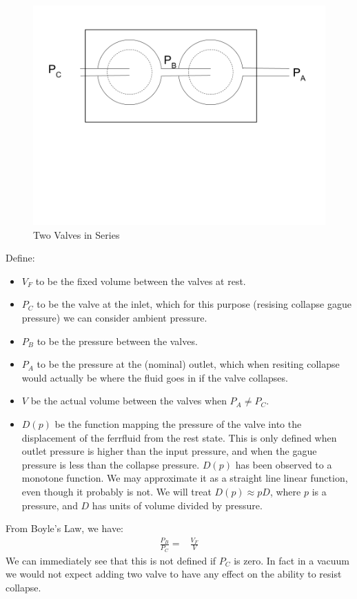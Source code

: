 \documentclass{asme2ej}
\begin{document}
\begin{figure}
\centerline{\includegraphics[width=6in]{figure/TwoValvesInSeries.png}}
\caption{Two Valves in Series}
\label{fig:Series}
\end{figure}

Define:
\begin{itemize}
\item $V_F$ to be the fixed volume between the valves at rest.
\item $P_C$ to be the valve at the inlet, which for this purpose (resising collapse gague pressure) we can consider ambient pressure.
\item $P_B$ to be the pressure between the valves.
\item $P_A$ to be the pressure at the (nominal) outlet, which when resiting
  collapse would actually be where the fluid goes in if the valve collapses.
\item $V$ be the actual volume between the valves when $P_A \neq P_C$.
\item $D(p)$ be the function mapping the pressure of the valve into
  the displacement of the ferrfluid from the rest state. This is
  only defined when outlet pressure is higher than the input pressure, and
  when the gague pressure is less than the collapse pressure. $D(p)$ has
  been observed to a monotone function. We may approximate it as a
  straight line linear function, even though it probably is not.
  We will treat $D(p) \approx pD$, where $p$ is a pressure, and $D$ has
  units of volume divided by pressure.
\end{itemize}

From Boyle's Law, we have:
\begin{align}
  \frac{P_B}{P_C} = & \frac{V_F}{V}
  \label{eq:boyle}
  \end{align}
We can immediately see that this is not defined if $P_C$ is zero.
In fact in a vacuum we would not expect adding two valve to have any
effect on the ability to resist collapse.
\end{document}
